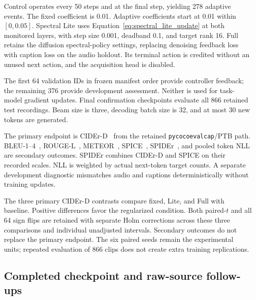 \documentclass[10pt,a4paper,twocolumn]{article}
\begin{document}
Control operates every 50 steps and at the final step,
yielding 278 adaptive events.
The fixed coefficient is 0.01.
Adaptive coefficients start at 0.01 within $[0,0.05]$.
Spectral Lite uses Equation~\eqref{eq:spectral_lite_update} at both
monitored layers, with step size 0.001, deadband 0.1, and target rank 16.
Full retains the diffusion spectral-policy settings, replacing
denoising feedback loss with caption loss on the audio holdout.
Its terminal action is credited without an unused next action,
and the acquisition head is disabled.

The first 64 validation IDs in frozen manifest order provide
controller feedback; the remaining 376 provide development
assessment. Neither is used for task-model gradient updates.
Final confirmation checkpoints evaluate all 866 retained test
recordings.
Beam size is three, decoding batch size is 32, and at most
30 new tokens are generated.

The primary endpoint is CIDEr-D~\cite{vedantam2015cider}
from the retained \texttt{pycocoevalcap}/PTB path.
BLEU-1--4~\cite{papineni2002bleu},
ROUGE-L~\cite{lin2004rouge},
METEOR~\cite{denkowski2014meteor},
SPICE~\cite{anderson2016spice},
SPIDEr~\cite{liu2017spider}, and pooled token NLL are
secondary outcomes.
SPIDEr combines CIDEr-D and SPICE on their recorded scales.
NLL is weighted by actual next-token target counts.
A separate development diagnostic mismatches audio and captions
deterministically without training updates.

The three primary CIDEr-D contrasts compare fixed, Lite,
and Full with baseline.
Positive differences favor the regularized condition.
Both paired-$t$ and all 64 sign flips are retained with
separate Holm corrections across these three comparisons
and individual unadjusted intervals.
Secondary outcomes do not replace the primary endpoint.
The six paired seeds remain the experimental units;
repeated evaluation of 866 clips does not create extra
training replications.



\subsection{Completed checkpoint and raw-source follow-ups}
\label{sec:completed_protocols}
\end{document}
